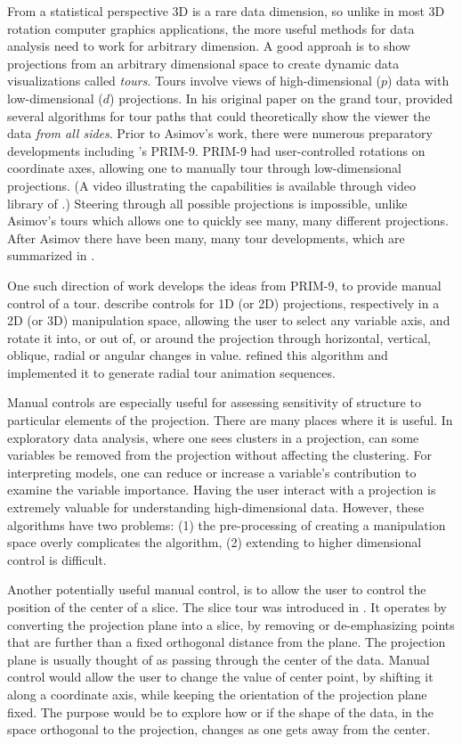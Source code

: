 \documentclass[]{interact}
\theoremstyle{plain}%
\theoremstyle{definition}
\theoremstyle{remark}
\begin{document}
From a statistical perspective 3D is a rare data dimension, so unlike in
most 3D rotation computer graphics applications, the more useful methods
for data analysis need to work for arbitrary dimension. A good approah
is to show projections from an arbitrary dimensional space to create
dynamic data visualizations called \emph{tours}. Tours involve views of
high-dimensional (\(p\)) data with low-dimensional (\(d\)) projections.
In his original paper on the grand tour, \citet{As85} provided several
algorithms for tour paths that could theoretically show the viewer the
data \emph{from all sides}. Prior to Asimov's work, there were numerous
preparatory developments including \citet{tukey}'s PRIM-9. PRIM-9 had
user-controlled rotations on coordinate axes, allowing one to manually
tour through low-dimensional projections. (A video illustrating the
capabilities is available through video library of \citet{ASA22}.)
Steering through all possible projections is impossible, unlike Asimov's
tours which allows one to quickly see many, many different projections.
After Asimov there have been many, many tour developments, which are
summarized in \citet{lee2021}.

One such direction of work develops the ideas from PRIM-9, to provide
manual control of a tour. \citet{cook_manual_1997} describe controls for
1D (or 2D) projections, respectively in a 2D (or 3D) manipulation space,
allowing the user to select any variable axis, and rotate it into, or
out of, or around the projection through horizontal, vertical, oblique,
radial or angular changes in value. \citet{spyrison_spinifex_2020}
refined this algorithm and implemented it to generate radial tour
animation sequences.

Manual controls are especially useful for assessing sensitivity of
structure to particular elements of the projection. There are many
places where it is useful. In exploratory data analysis, where one sees
clusters in a projection, can some variables be removed from the
projection without affecting the clustering. For interpreting models,
one can reduce or increase a variable's contribution to examine the
variable importance. Having the user interact with a projection is
extremely valuable for understanding high-dimensional data. However,
these algorithms have two problems: (1) the pre-processing of creating a
manipulation space overly complicates the algorithm, (2) extending to
higher dimensional control is difficult.

Another potentially useful manual control, is to allow the user to
control the position of the center of a slice. The slice tour was
introduced in \citet{slicetour}. It operates by converting the
projection plane into a slice, by removing or de-emphasizing points that
are further than a fixed orthogonal distance from the plane. The
projection plane is usually thought of as passing through the center of
the data. Manual control would allow the user to change the value of
center point, by shifting it along a coordinate axis, while keeping the
orientation of the projection plane fixed. The purpose would be to
explore how or if the shape of the data, in the space orthogonal to the
projection, changes as one gets away from the center.
\end{document}
